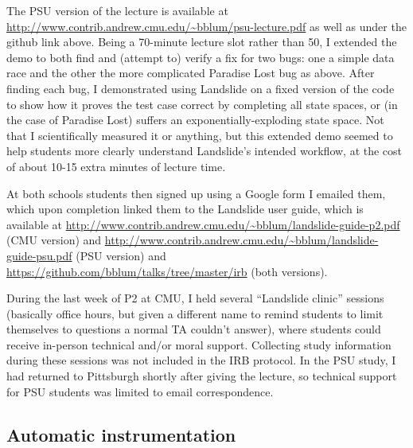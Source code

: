The PSU version of the lecture
is available at
\url{http://www.contrib.andrew.cmu.edu/~bblum/psu-lecture.pdf}
as well as under the github link above.
Being a 70-minute lecture slot rather than 50, I extended the demo to
both find and (attempt to) verify a fix for two bugs:
one a simple data race and the other the more complicated Paradise Lost bug as above.
After finding each bug, I demonstrated using Landslide on a fixed version of the code
to show how it proves the test case correct by completing all state spaces,
or (in the case of Paradise Lost) suffers an exponentially-exploding state space.
Not that I scientifically measured it or anything,
but this extended demo seemed to help students more clearly understand Landslide's intended workflow,
at the cost of about 10-15 extra minutes of lecture time.

At both schools students then signed up using a Google form I emailed them,
which upon completion linked them to the Landslide user guide,
which is available at
\url{http://www.contrib.andrew.cmu.edu/~bblum/landslide-guide-p2.pdf}
(CMU version)
and
\url{http://www.contrib.andrew.cmu.edu/~bblum/landslide-guide-psu.pdf}
(PSU version)
and
\url{https://github.com/bblum/talks/tree/master/irb}
(both versions).

During the last week of P2 at CMU, I held several ``Landslide clinic'' sessions
(basically office hours, but given a different name to remind students
to limit themselves to questions a normal TA couldn't answer),
where students could receive in-person technical and/or moral support.
Collecting study information during these sessions was not included in the IRB protocol.
In the PSU study, I had returned to Pittsburgh shortly after giving the lecture,
so technical support for PSU students was limited to email correspondence.

\subsection{Automatic instrumentation}
\label{sec:education-pebbles-instrumentation}


